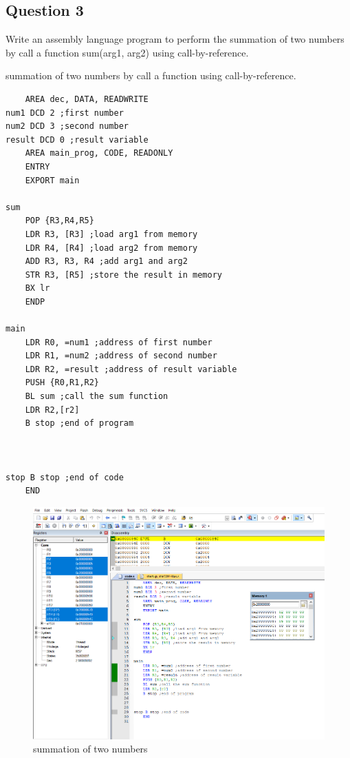 \documentclass[11pt]{article}
\begin{document}
\subsection{Question 3}
Write an assembly language program to perform the summation of two numbers by call a function sum(arg1, arg2) using call-by-reference.
\begin{listing}[h]
    \caption{summation of two numbers by call a function using call-by-reference.}
    \begin{verbatim}
	AREA dec, DATA, READWRITE
num1 DCD 2 ;first number
num2 DCD 3 ;second number
result DCD 0 ;result variable
	AREA main_prog, CODE, READONLY
	ENTRY
	EXPORT main
		
sum
	POP {R3,R4,R5}
    LDR R3, [R3] ;load arg1 from memory
    LDR R4, [R4] ;load arg2 from memory
    ADD R3, R3, R4 ;add arg1 and arg2
    STR R3, [R5] ;store the result in memory
	BX lr
    ENDP
	
main
	LDR R0, =num1 ;address of first number
	LDR R1, =num2 ;address of second number
	LDR R2, =result ;address of result variable
	PUSH {R0,R1,R2}
	BL sum ;call the sum function
	LDR R2,[r2]
	B stop ;end of program
	

	
stop B stop ;end of code
	END

\end{verbatim}
\end{listing}
\clearpage
\begin{figure}[!h]
    \centering
    \includegraphics[width=\textwidth]{prob3.PNG}
    \caption{summation of two numbers}
\end{figure} 
\clearpage
\end{document}
